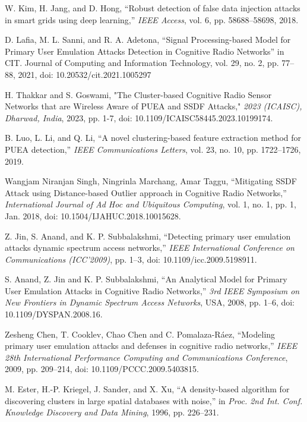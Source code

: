 \documentclass[10pt, oneside, article]{Thesis} %
\begin{document}
\begin{thebibliography}{25}
W. Kim, H. Jang, and D. Hong, ``Robust detection of false data injection attacks in smart grids using deep learning,'' \emph{IEEE Access}, vol. 6, pp. 58688--58698, 2018.

D. Lafia, M. L. Sanni, and R. A. Adetona, “Signal Processing-based Model for Primary User Emulation Attacks Detection in Cognitive Radio Networks” in CIT. Journal of Computing and Information Technology, vol. 29, no. 2, pp. 77–88, 2021, doi: 10.20532/cit.2021.1005297 

H. Thakkar and S. Goswami, "The Cluster-based Cognitive Radio Sensor Networks that are Wireless Aware of PUEA and SSDF Attacks," \textit{2023 (ICAISC), Dharwad, India}, 2023, pp. 1-7, doi: 10.1109/ICAISC58445.2023.10199174.

B. Luo, L. Li, and Q. Li, ``A novel clustering-based feature extraction method for PUEA detection,'' \emph{IEEE Communications Letters}, vol. 23, no. 10, pp. 1722--1726, 2019.

Wangjam Niranjan Singh, Ningrinla Marchang, Amar Taggu, ``Mitigating SSDF Attack using Distance-based Outlier approach in Cognitive Radio Networks,'' \emph{International Journal of Ad Hoc and Ubiquitous Computing}, vol. 1, no. 1, pp. 1, Jan. 2018, doi: 10.1504/IJAHUC.2018.10015628.

Z. Jin, S. Anand, and K. P. Subbalakshmi, ``Detecting primary user emulation attacks dynamic spectrum access networks,'' \emph{IEEE International Conference on Communications (ICC'2009)}, pp. 1--3, doi: 10.1109/icc.2009.5198911.

S. Anand, Z. Jin and K. P. Subbalakshmi, ``An Analytical Model for Primary User Emulation Attacks in Cognitive Radio Networks,'' \emph{3rd IEEE Symposium on New Frontiers in Dynamic Spectrum Access Networks}, USA, 2008, pp. 1--6, doi: 10.1109/DYSPAN.2008.16.

Zesheng Chen, T. Cooklev, Chao Chen and C. Pomalaza-R\'aez, ``Modeling primary user emulation attacks and defenses in cognitive radio networks,'' \emph{IEEE 28th International Performance Computing and Communications Conference}, 2009, pp. 209--214, doi: 10.1109/PCCC.2009.5403815.

M. Ester, H.-P. Kriegel, J. Sander, and X. Xu, ``A density-based algorithm for discovering clusters in large spatial databases with noise,'' in \emph{Proc. 2nd Int. Conf. Knowledge Discovery and Data Mining}, 1996, pp. 226--231.


\end{thebibliography}
\end{document}
